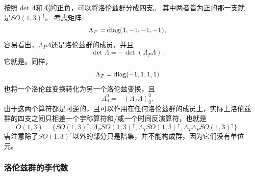 按照$\det \Lambda$和$\Lambda_0^0$的正负，可以将洛伦兹群分成四支。
其中两者皆为正的那一支就是$SO(1,3)^\uparrow$。
考虑矩阵
\begin{equation}
    \Lambda_P = \operatorname{diag} (1, -1, -1, -1), 
\end{equation}
容易看出，$\Lambda_P \Lambda$还是洛伦兹群的成员，并且
\[
    \det \Lambda = - \det (\Lambda_P \Lambda).
\]
它就是。同样，
\begin{equation}
    \Lambda_T = \operatorname{diag}(-1, 1, 1, 1)
\end{equation}
也将一个洛伦兹变换转化为另一个洛伦兹变换，且
\[
    \Lambda_0^0 = - (\Lambda_T \Lambda)_0^0.
\]
由于这两个算符都是可逆的，且可以作用在任何洛伦兹群的成员上，实际上洛伦兹群的四支之间只相差一个宇称算符和/或一个时间反演算符，也就是
\begin{equation}
    O(1, 3) = \{ SO(1,3)^\uparrow, \Lambda_P SO(1,3)^\uparrow, \Lambda_T SO(1,3)^\uparrow, \Lambda_T \Lambda_P SO(1,3)^\uparrow \}.
    \label{eq:4-parts-of-o13}
\end{equation}
需注意除了$SO(1,3)^\uparrow$以外的部分只是陪集，并不能构成群，因为它们没有单位元。

\subsubsection{洛伦兹群的李代数}

